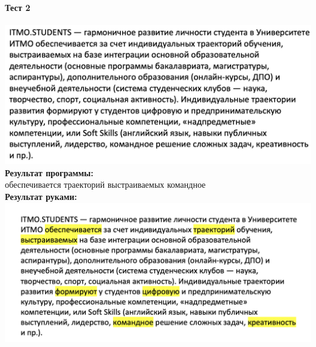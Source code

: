 \documentclass[12pt,onecolumn]{article}
\begin{document}
\begin{flushleft}
\paragraph{Тест 2}
\hfill \break
\includegraphics[scale=0.4]{prog2/p2.png}\\
\textbf{Результат программы:}\\
обеспечивается траекторий выстраиваемых командное\\
\textbf{Результат руками:}\\
\includegraphics[scale=0.4]{prog2/p2+.png}\\

\end{flushleft}
\end{document}
